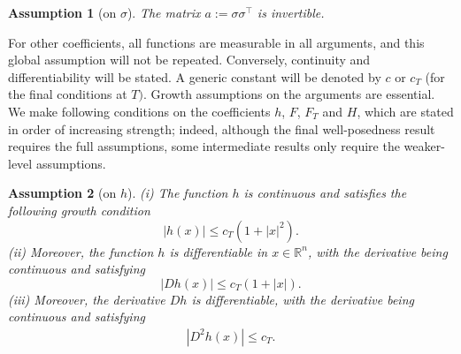 \documentclass[11pt]{article}
\numberwithin{equation}{section}
\newtheorem{assumption}{Assumption}[section]
\newcommand{\brn}{{\mathbb{R}^n}}
\newcommand{\1}{\mbox{1\hspace{-1mm}I}}
\begin{document}
\begin{assumption}[on $\sigma$]\label{eq:5-8}
    The matrix $a:=\sigma\sigma^\top$ is invertible.
\end{assumption}

For other coefficients, all functions are measurable in all arguments, and this global assumption will not be repeated. Conversely, continuity and differentiability will be stated. A generic constant will be denoted by $c$ or $c_{T}$ (for the final conditions at $T)$. Growth assumptions on the arguments are essential. We make following conditions on the coefficients $h$, $F$, $F_T$ and $H$, which are stated in order of increasing strength; indeed, although the final well-posedness result requires the full assumptions, some intermediate results only require the weaker-level assumptions.

\begin{assumption}[on $h$] \label{assumption:h}
    (i) The function $h$ is continuous and satisfies the following growth condition
    \begin{equation*}
        |h(x)|\leq c_{T}(1+|x|^{2}). 
    \end{equation*}
    (ii) Moreover, the function $h$ is differentiable in $x\in\brn$, with the derivative being continuous and satisfying 
    \begin{equation*}
        |Dh(x)|\leq c_{T}(1+|x|). 
    \end{equation*}
    (iii) Moreover, the derivative $Dh$ is differentiable, with the derivative being continuous and satisfying 
    \begin{align*}
        \left|D^{2}h(x)\right|\le c_T.
    \end{align*}
\end{assumption}
\end{document}
